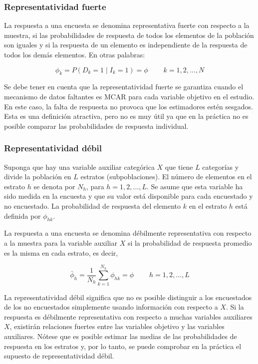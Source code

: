\documentclass[
  10pt,
  spanish,
]{book}
\begin{document}
\hypertarget{representatividad-fuerte}{%
\subsubsection*{Representatividad fuerte}\label{representatividad-fuerte}}

La respuesta a una encuesta se denomina representativa fuerte con
respecto a la muestra, si las probabilidades de respuesta de todos
los elementos de la población son iguales y si la respuesta de un
elemento es independiente de la respuesta de todos los demás elementos.
En otras palabras:

\[
\phi_{k} = P\left(D_{k}=1\mid I_{k}=1\right) =  \phi  \ \ \ \ \ \ \ \ \ \ k=1,2,\ldots,N
\]

Se debe tener en cuenta que la representatividad fuerte se garantiza cuando el mecanismo de datos faltantes es MCAR para cada variable objetivo en el estudio. En este caso, la falta de respuesta no provoca que los estimadores estén sesgados. Esta es una definición atractiva, pero no es muy útil ya que en la práctica no es posible comparar las probabilidades de respuesta individual.

\hypertarget{representatividad-duxe9bil}{%
\subsubsection*{Representatividad débil}\label{representatividad-duxe9bil}}

Suponga que hay una variable auxiliar categórica \(X\) que tiene \(L\)
categorías y divide la población en \(L\) estratos (subpoblaciones).
El número de elementos en el estrato \(h\) se denota por \(N_{h}\),
para \(h=1,2,\ldots,L\). Se asume que esta variable ha sido medida
en la encuesta y que su valor está disponible para cada encuestado
y no encuestado. La probabilidad de respuesta del elemento \(k\) en
el estrato \(h\) está definida por \(\phi_{hk}\).

La respuesta a una encuesta se denomina débilmente representativa
con respecto a la muestra para la variable auxiliar \(X\) si la probabilidad
de respuesta promedio es la misma en cada estrato, es decir,

\[
\bar{\phi}_{h} =  
\frac{1}{N_{h}}\sum_{k=1}^{N_{h}}\phi_{hk} =
\phi \ \ \ \ \ \ \ \ \ \  h=1,2,\ldots,L
\]

La representatividad débil significa que no es posible distinguir
a los encuestados de los no encuestados simplemente usando información
con respecto a \(X\). Si la respuesta es débilmente representativa con respecto a muchas variables auxiliares \(X\), existirán relaciones fuertes entre las variables objetivo y las variables auxiliares. Nótese que es posible estimar las medias de las probabilidades de respuesta
en los estratos y, por lo tanto, se puede comprobar en la práctica
el supuesto de representatividad débil.
\end{document}
